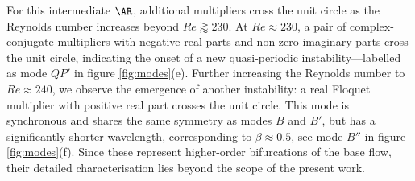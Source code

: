For this intermediate $\AR$, additional multipliers cross the unit circle as the Reynolds number increases beyond $Re \gtrapprox 230$. At $Re \approx 230$, a pair of complex-conjugate multipliers with negative real parts and non-zero imaginary parts cross the unit circle, indicating the onset of a new quasi-periodic instability---labelled as mode $QP'$ in figure \ref{fig:modes}(e). Further increasing the Reynolds number to $Re \approx 240$, we observe the emergence of another instability: a real Floquet multiplier with positive real part crosses the unit circle. This mode is synchronous and shares the same symmetry as modes $B$ and $B'$, but has a significantly shorter wavelength, corresponding to $\beta \approx 0.5$, see mode $B''$ in figure \ref{fig:modes}(f). Since these represent higher-order bifurcations of the base flow, their detailed characterisation lies beyond the scope of the present work.



